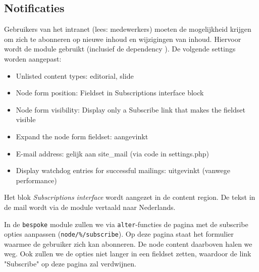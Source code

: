 \subsection{Notificaties}\label{notificaties}

Gebruikers van het intranet (lees: medewerkers) moeten de mogelijkheid krijgen om zich te abonneren op nieuwe inhoud en wijzigingen van inhoud. Hiervoor wordt de  module gebruikt (inclusief de dependency ). De volgende settings worden aangepast:
\begin{itemize}
\item Unlisted content types: editorial, slide
\item Node form position: Fieldset in Subscriptions interface block
\item Node form visibility: Display only a Subscribe link that makes the fieldset visible 
\item Expand the node form fieldset: aangevinkt
\item E-mail address: gelijk aan site\_mail (via code in settings.php)
\item Display watchdog entries for successful mailings: uitgevinkt (vanwege performance)
\end{itemize}
Het blok \emph{Subscriptions interface} wordt aangezet in de content region.
De tekst in de mail wordt via de  module vertaald naar Nederlands.

In de \texttt{bespoke} module zullen we via \texttt{alter}-functies de pagina met de subscribe opties aanpassen (\texttt{node/\%/subscribe}). Op deze pagina staat het formulier waarmee de gebruiker zich kan abonneren. De node content daarboven halen we weg. Ook zullen we de opties niet langer in een fieldset zetten, waardoor de link "Subscribe" op deze pagina zal verdwijnen.

